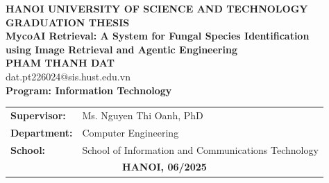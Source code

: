 \begin{titlepage}
\thispagestyle{empty}
\begin{center}

{\large\textbf{HANOI UNIVERSITY OF SCIENCE AND TECHNOLOGY}}\\[5cm]

{\Huge\textbf{GRADUATION THESIS}}\\[2cm]

{\Large\textbf{MycoAI Retrieval: A System for Fungal Species Identification\\using Image Retrieval and Agentic Engineering}}\\[3cm]

{\large\textbf{PHAM THANH DAT}}\\[0.3cm]
{\large dat.pt226024@sis.hust.edu.vn}\\[1cm]

{\large\textbf{Program: Information Technology}}\\[5cm]

\begin{tabular}{ll}
\textbf{Supervisor:} & Ms. Nguyen Thi Oanh, PhD \\[0.5cm]
\textbf{Department:} & Computer Engineering \\[0.5cm]
\textbf{School:} & School of Information and Communications Technology \\[5cm]
\multicolumn{2}{c}{\textbf{HANOI, 06/2025}}
\end{tabular}

\end{center}
\end{titlepage}
